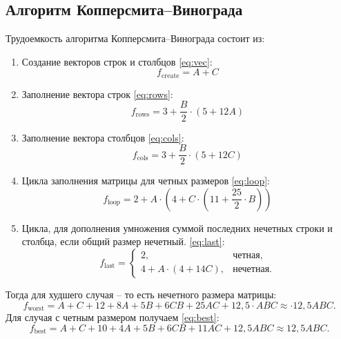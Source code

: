 \subsection{Алгоритм Копперсмита--Винограда}
Трудоемкость алгоритма Копперсмита--Винограда состоит из:
\begin{enumerate}[1.]
    \item Создание векторов строк и столбцов \ref{eq:vec}:
    \begin{equation}
        f_{\text{create}} = A + C
        \label{eq:vec}
    \end{equation}
    \item Заполнение вектора строк \ref{eq:rows}:
    \begin{equation}
        f_{\text{rows}} = 3 + \frac{B}{2} \cdot (5 + 12A)
        \label{eq:rows}
    \end{equation}
    \item Заполнение вектора столбцов \ref{eq:cols}:
    \begin{equation}
        f_{\text{cols}} = 3 + \frac{B}{2} \cdot (5 + 12C)
        \label{eq:cols}
    \end{equation}
    \item Цикла заполнения матрицы для четных размеров \ref{eq:loop}:
    \begin{equation}
        f_{\text{loop}} = 2 + A \cdot (4 + C \cdot (11 + \frac{25}{2} \cdot B))
        \label{eq:loop}
    \end{equation}
    \item Цикла, для дополнения умножения суммой последних нечетных строки и столбца, если общий размер нечетный. \ref{eq:last}:
    \begin{equation}
        f_{\text{last}} = \begin{cases}
            2,& \text{четная},\\
            4 + A \cdot (4 + 14C),& \text{нечетная}.
        \end{cases}
        \label{eq:last}
    \end{equation}

\end{enumerate}

Тогда для худшего случая -- то есть нечетного размера матрицы:
\begin{equation}
    f_{\text{worst}} = A + C + 12 + 8A + 5B + 6CB + 25AC + 12,5 \cdot ABC \approx \cdot 12,5ABC.
\end{equation}
Для случая с четным размером получаем \ref{eq:best}:
\begin{equation}
    f_{\text{best}} = A + C + 10 + 4A + 5B + 6CB + 11AC + 12,5ABC \approx 12,5ABC.
    \label{eq:best}
\end{equation}

